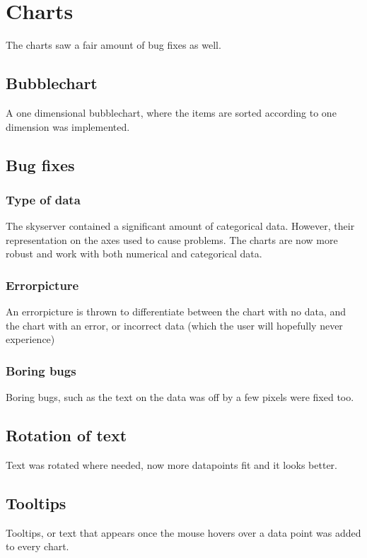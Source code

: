 \section{Charts}
The charts saw a fair amount of bug fixes as well.

\subsection{Bubblechart}
A one dimensional bubblechart, where the items are sorted according to one dimension was implemented.

\subsection{Bug fixes}
  \subsubsection{Type of data}
  The skyserver contained a significant amount of categorical data. However, their representation on the axes
  used to cause problems. The charts are now more robust and work with both numerical and categorical data.
  \subsubsection{Errorpicture}
  An errorpicture is thrown to differentiate between the chart with no data, and the chart with an error,
  or incorrect data (which the user will hopefully never experience)
  \subsubsection{Boring bugs}
  Boring bugs, such as the text on the data was off by a few pixels were fixed too.
  


\subsection{Rotation of text}
  Text was rotated where needed, now more datapoints fit and it looks better.

\subsection{Tooltips}
  Tooltips, or text that appears once the mouse hovers over a data point was added to every chart.
